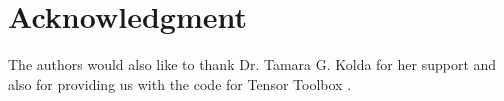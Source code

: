 \documentclass{sig-alternate}
\begin{document}

\section*{Acknowledgment}

The authors would also like to thank Dr. Tamara G. Kolda for her support and also for providing us with the code for Tensor Toolbox \cite{kolda07}. 


%


\end{document}
